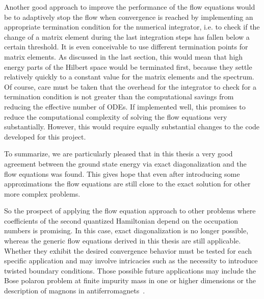 Another good approach to improve the performance of the flow equations would be to adaptively stop the flow when convergence is reached by implementing an appropriate termination condition for the numerical integrator, i.e. to check if the change of a matrix element during the last integration steps has fallen below a certain threshold. It is even conceivable to use different termination points for matrix elements. As discussed in the last section, this would mean that high energy parts of the Hilbert space would be terminated first, because they settle relatively quickly to a constant value for the matrix elements and the spectrum. Of course, care must be taken that the overhead for the integrator to check for a termination condition is not greater than the computational savings from reducing the effective number of ODEs. If implemented well, this promises to reduce the computational complexity of solving the flow equations very substantially. However, this would require equally substantial changes to the code developed for this project. \par
To summarize, we are particularly pleased that in this thesis a very good agreement between the ground state energy via exact diagonalization and the flow equations was found. This gives hope that even after introducing some approximations the flow equations are still close to the exact solution for other more complex problems.\par
So the prospect of applying the flow equation approach to other problems where coefficients of the second quantized Hamiltonian depend on the occupation numbers is promising. In this case, exact diagonalization is no longer possible, whereas the generic flow equations derived in this thesis are still applicable. Whether they exhibit the desired convergence behavior must be tested for each specific application and may involve intricacies such as the necessity to introduce twisted boundary conditions. 
Those possible future applications may include the Bose polaron problem at finite impurity mass in one or higher dimensions or the description of magnons in \mbox{antiferromagnets \cite{Bermes_2023}}.
